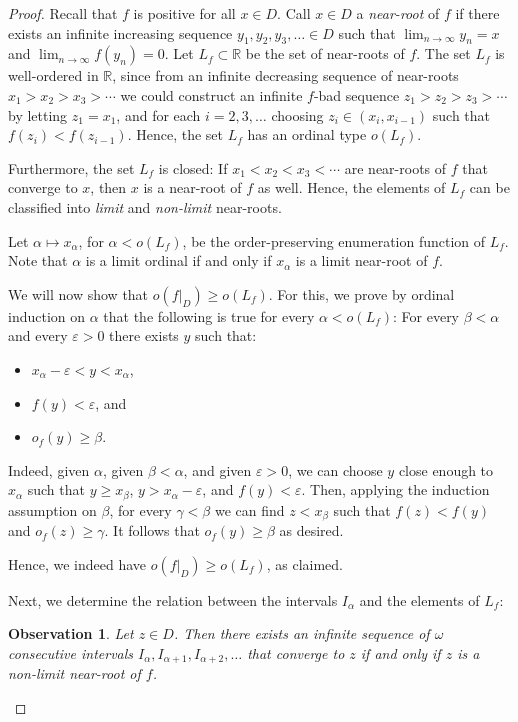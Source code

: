\documentclass{article}
\newtheorem{Observation}[Theorem]{Observation}
\theoremstyle{definition}
\begin{document}
\begin{proof}
Recall that $f$ is positive for all $x\in D$. Call $x\in D$ a \emph{near-root} of $f$ if there exists an infinite increasing sequence $y_1,y_2,y_3,\ldots\in D$ such that $\lim_{n\to\infty} y_n = x$ and $\lim_{n\to\infty} f(y_n) = 0$. Let $L_f\subset \mathbb R$ be the set of near-roots of $f$. The set $L_f$ is well-ordered in $\mathbb R$, since from an infinite decreasing sequence of near-roots $x_1>x_2>x_3>\cdots$ we could construct an infinite $f$-bad sequence $z_1>z_2>z_3>\cdots$ by letting $z_1=x_1$, and for each $i=2,3,\ldots$ choosing $z_i\in(x_i,x_{i-1})$ such that $f(z_i)<f(z_{i-1})$. Hence, the set $L_f$ has an ordinal type $o(L_f)$.

Furthermore, the set $L_f$ is closed: If $x_1<x_2<x_3<\cdots$ are near-roots of $f$ that converge to $x$, then $x$ is a near-root of $f$ as well. Hence, the elements of $L_f$ can be classified into \emph{limit} and \emph{non-limit} near-roots. 

Let $\alpha\mapsto x_\alpha$, for $\alpha<o(L_f)$, be the order-preserving enumeration function of $L_f$. Note that $\alpha$ is a limit ordinal if and only if $x_\alpha$ is a limit near-root of $f$.

We will now show that $o(f|_D)\ge o(L_f)$.
For this, we prove by ordinal induction on $\alpha$ that the following is true for every $\alpha<o(L_f)$: For every $\beta<\alpha$ and every $\varepsilon>0$ there exists $y$ such that:
\begin{itemize}
    \item $x_\alpha-\varepsilon<y<x_\alpha$,
    \item $f(y)<\varepsilon$, and
    \item $o_f(y)\ge \beta$.
\end{itemize}
Indeed, given $\alpha$, given $\beta<\alpha$, and given $\varepsilon>0$, we can choose $y$ close enough to $x_\alpha$ such that $y\ge x_\beta$, $y>x_\alpha-\varepsilon$, and $f(y)<\varepsilon$. Then, applying the induction assumption on $\beta$, for every $\gamma<\beta$ we can find $z<x_\beta$ such that $f(z)<f(y)$ and $o_f(z)\ge \gamma$. It follows that $o_f(y)\ge \beta$ as desired.

Hence, we indeed have $o(f|_D)\ge o(L_f)$, as claimed.

Next, we determine the relation between the intervals $I_\alpha$ and the elements of $L_f$:


\begin{Observation}\label{obs_w-many}
    Let $z\in D$. Then there exists an infinite sequence of $\omega$ consecutive intervals $I_{\alpha}, I_{\alpha+1},\allowbreak I_{\alpha+2},\ldots$ that converge to $z$ if and only if $z$ is a non-limit near-root of $f$.
\end{Observation}


\end{proof}
\end{document}
